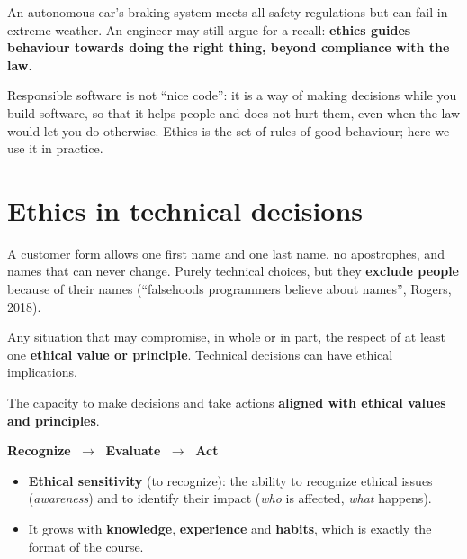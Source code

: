 \documentclass[11pt,a4paper,openany]{book}
\begin{document}
\begin{keybox}[title={Ethics goes beyond the law}]
An autonomous car's braking system meets all safety regulations but can fail in extreme
weather. An engineer may still argue for a recall: \textbf{ethics guides behaviour towards
doing the right thing, beyond compliance with the law}.
\end{keybox}

\begin{goatbox}
Responsible software is not ``nice code'': it is a way of making decisions while you build
software, so that it helps people and does not hurt them, even when the law would let you do
otherwise. Ethics is the set of rules of good behaviour; here we use it in practice.
\end{goatbox}


\section{Ethics in technical decisions}

\begin{exbox}[title={A ``simple'' form}]
A customer form allows one first name and one last name, no apostrophes, and names that can
never change. Purely technical choices, but they \textbf{exclude people} because of their names
(``falsehoods programmers believe about names'', Rogers, 2018).
\end{exbox}

\begin{defnbox}[title={Ethical issue}]
Any situation that may compromise, in whole or in part, the respect of at least one
\textbf{ethical value or principle}. Technical decisions can have ethical implications.
\end{defnbox}

\begin{defnbox}[title={Ethical agency}]
The capacity to make decisions and take actions \textbf{aligned with ethical values and
principles}.
\end{defnbox}

\begin{propbox}[title={Ethical decision-making (Rest, 1986; Schwartz, 2016)}]
\begin{center}
\textbf{Recognize} $\;\longrightarrow\;$ \textbf{Evaluate} $\;\longrightarrow\;$ \textbf{Act}
\end{center}
\begin{itemize}
  \item \textbf{Ethical sensitivity} (to recognize): the ability to recognize ethical issues
        (\emph{awareness}) and to identify their impact (\emph{who} is affected, \emph{what}
        happens).
  \item It grows with \textbf{knowledge}, \textbf{experience} and \textbf{habits}, which is
        exactly the format of the course.
\end{itemize}
\end{propbox}
\end{document}
